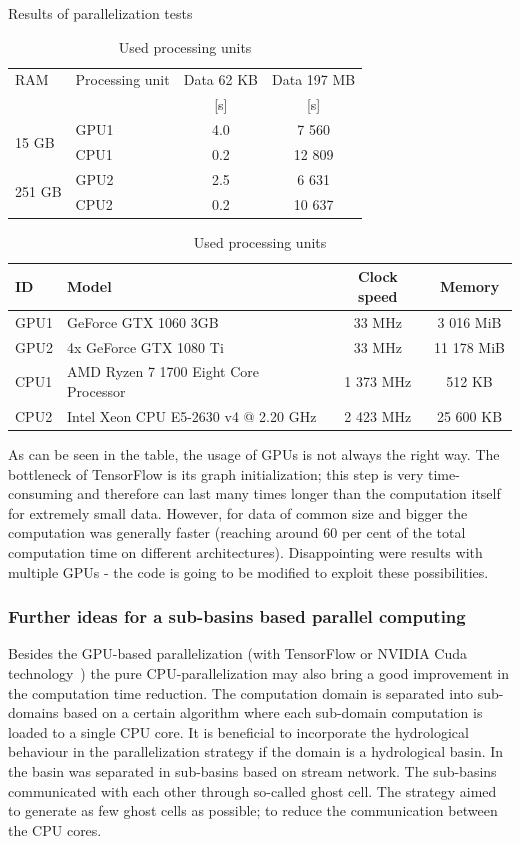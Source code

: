 \begin{table}[h]
  \centering
  \caption{Results of parallelization tests}
  \makegapedcells
  \begin{tabular}{|l|p{2.2cm}|c|c|}\hline
    RAM & Processing unit & Data 62 KB & Data 197 MB\\
     & & [s] & [s]\\\hline
    \multirow{2}{*}{15 GB} & GPU1 & 4.0 & 7 560\\
    & CPU1 & 0.2 & 12 809\\\hline
    \multirow{2}{*}{251 GB} & GPU2 & 2.5 & 6 631\\
    & CPU2 & 0.2 & 10 637\\\hline
  \end{tabular}
  \label{tab:GPU_results}
  \caption{Used processing units}
  \begin{tabular}{|l|p{1.9cm}|c|c|}\hline
    ID & Model & Clock speed & Memory\\\hline
    GPU1 & GeForce GTX 1060 3GB & 33 MHz & 3 016 MiB \\\hline
    GPU2 & 4x GeForce GTX 1080 Ti & 33 MHz & 11 178 MiB \\\hline
    CPU1 & AMD Ryzen 7 1700 Eight Core Processor & 1 373 MHz & 512 KB \\\hline
    CPU2 & Intel Xeon CPU E5-2630 v4 @ 2.20 GHz & 2 423 MHz & 25 600 KB \\\hline
  \end{tabular}
\end{table}

As can be seen in the table, the usage of GPUs is not always the right way.
The bottleneck of TensorFlow is its graph initialization; this step is very
time-consuming and therefore can last many times longer than the computation
itself for extremely small data. However, for data of common size and bigger
the computation was generally faster (reaching around 60 per cent of the total
computation time on different architectures). Disappointing were results with
multiple GPUs - the code is going to be modified to exploit these
possibilities.

\subsubsection{Further ideas for a sub-basins based parallel computing}
Besides the GPU-based parallelization (with TensorFlow \cite{tensorflow2015-whitepaper} or
NVIDIA Cuda technology~\cite{Kalyanapu2011,Le2015}) the
pure CPU-parallelization may also bring a good improvement in the computation
time reduction. The computation domain is separated into sub-domains
based on a certain algorithm where each sub-domain computation is loaded to a single
CPU core.  It is beneficial to incorporate the
hydrological behaviour in the parallelization
strategy if the domain is a hydrological basin. 
In~\cite{Vivoni2011} the basin was separated in sub-basins
based on stream network. The sub-basins communicated with each other through so-called
ghost cell. The strategy aimed to generate as few ghost cells as
possible; to reduce the communication between the CPU cores. 

